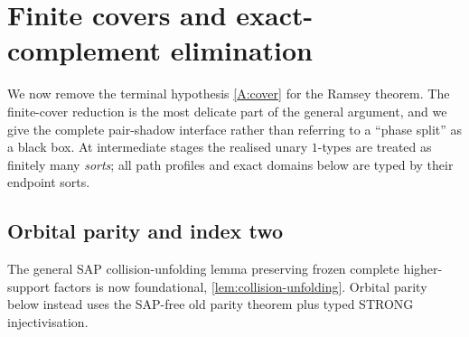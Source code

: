 \section{Finite covers and exact-complement elimination}
\label{sec:finite-covers}

We now remove the terminal hypothesis \ref{A:cover} for the Ramsey theorem.
The finite-cover reduction is the most delicate part of the general argument,
and we give the complete pair-shadow interface rather than referring to a
``phase split'' as a black box.  At intermediate stages the realised unary
$1$-types are treated as finitely many \emph{sorts}; all path profiles and
exact domains below are typed by their endpoint sorts.

\subsection{Orbital parity and index two}

The general SAP collision-unfolding lemma preserving frozen complete
higher-support factors is now foundational,
\cref{lem:collision-unfolding}. Orbital parity below instead uses the
SAP-free old parity theorem plus typed STRONG injectivisation.


